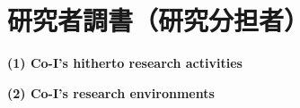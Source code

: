 
\section{研究者調書（研究分担者）}

\renewcommand{\研究者氏名}{朝永振一郎}
\renewcommand{\研究者氏名ふりがな}{ともなが　しんいちろう}
\renewcommand{\研究者生年月日の年}{1900}
\renewcommand{\研究者生年月日の月}{4}
\renewcommand{\研究者生年月日の日}{31}
\renewcommand{\研究者年齢}{137}
\renewcommand{\研究者所属機関部局職}{\small{江戸文理大学\\ 理学部\\ 名誉教授}}	%
\renewcommand{\研究者学位}{理学博士}


\vspace*{-1cm}
	\noindent
	\textbf{(1) Co-I's hitherto research activities}\\
\PapersInstructions	%


	\noindent
	\textbf{(2) Co-I's research environments}\\

%			
%					




